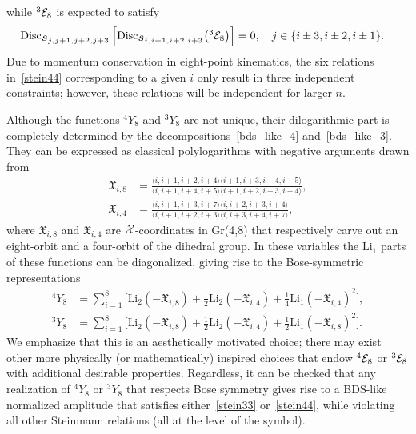 \documentclass[11pt]{article}
\def\mand#1{\scaleto{s}{4.6pt}_{\scaleto{#1}{5.2pt}}}
\begin{document}
while ${}^3 {\cal E}_8$ is expected to satisfy
\begin{equation}
\begin{split}
\text{Disc}_{\mand{j,j+1,j+2,j+3}}\left[\text{Disc}_{\mand{i,i+1,i+2,i+3}} \big({}^3 {\cal E}_8 \big) \right] &= 0, \quad j \in \{ i \pm 3, i \pm 2, i \pm 1 \}.  \label{stein44}
\end{split}
\end{equation}
Due to momentum conservation in eight-point kinematics, the six relations in~\eqref{stein44} corresponding to a given $i$ only result in three independent constraints; however, these relations will be independent for larger $n$.

Although the functions ${}^4 Y_{8}$ and ${}^3 Y_{8}$ are not unique, their dilogarithmic part is completely determined by the decompositions~\eqref{bds_like_4} and~\eqref{bds_like_3}. They can be expressed as classical polylogarithms with negative arguments drawn from \begin{align}
\mathfrak{X}_{i,8} &= \frac{\langle i,i+1,i+2,i+4 \rangle \langle i+1,i+3,i+4,i+5\rangle}{\langle i,i+1,i+4,i+5 \rangle \langle i+1,i+2,i+3,i+4 \rangle}, \\
\mathfrak{X}_{i,4} &= \frac{\langle i,i+1,i+3,i+7 \rangle \langle i,i+2,i+3,i+4 \rangle}{\langle i,i+1,i+2,i+3 \rangle \langle i,i+3,i+4,i+7 \rangle},
\end{align}
where $\mathfrak{X}_{i,8}$ and $\mathfrak{X}_{i,4}$ are ${\cal X}$-coordinates in Gr(4,8) that respectively carve out an eight-orbit and a four-orbit of the dihedral group. In these variables the $\text{Li}_1$ parts of these functions can be diagonalized, giving rise to the Bose-symmetric representations
\begin{align}
{}^4 Y_8 &= \sum_{i=1}^8 \bigg[ \text{Li}_2 \left( - \mathfrak{X}_{i,8} \right) + \frac12 \text{Li}_2 \left(- \mathfrak{X}_{i,4}  \right) + \frac14 \text{Li}_1\left(- \mathfrak{X}_{i,4} \right)^2 \bigg], \\
{}^3 Y_8 &= \sum_{i=1}^8 \bigg[ \text{Li}_2 \left( - \mathfrak{X}_{i,8} \right) + \frac12 \text{Li}_2 \left(- \mathfrak{X}_{i,4}  \right) + \frac12 \text{Li}_1\left(- \mathfrak{X}_{i,8} \right)^2 \bigg].
\end{align}
We emphasize that this is an aesthetically motivated choice; there may exist other more physically (or mathematically) inspired choices that endow ${}^4 {\cal E}_8$ or ${}^3 {\cal E}_8$ with additional desirable properties. Regardless, it can be checked that any realization of ${}^4 Y_8$ or ${}^3 Y_8$ that respects Bose symmetry gives rise to a BDS-like normalized amplitude that satisfies either~\eqref{stein33} or~\eqref{stein44}, while violating all other Steinmann relations (all at the level of the symbol). 
\end{document}
